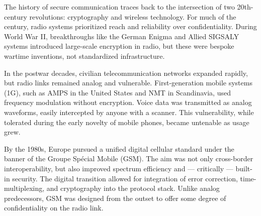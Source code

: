\begin{historical}
The history of secure communication traces back to the intersection of two 20th-century revolutions: cryptography and wireless technology. For much of the century, radio systems prioritized reach and reliability over confidentiality. During World War II, breakthroughs like the German Enigma and Allied SIGSALY systems introduced large-scale encryption in radio, but these were bespoke wartime inventions, not standardized infrastructure.

In the postwar decades, civilian telecommunication networks expanded rapidly, but radio links remained analog and vulnerable. First-generation mobile systems (1G), such as AMPS in the United States and NMT in Scandinavia, used frequency modulation without encryption. Voice data was transmitted as analog waveforms, easily intercepted by anyone with a scanner. This vulnerability, while tolerated during the early novelty of mobile phones, became untenable as usage grew.

By the 1980s, Europe pursued a unified digital cellular standard under the banner of the Groupe Spécial Mobile (GSM). The aim was not only cross-border interoperability, but also improved spectrum efficiency and — critically — built-in security. The digital transition allowed for integration of error correction, time-multiplexing, and cryptography into the protocol stack. Unlike analog predecessors, GSM was designed from the outset to offer some degree of confidentiality on the radio link.
\end{historical}
